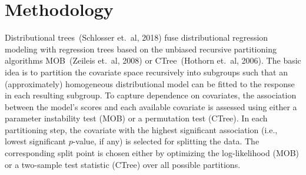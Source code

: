 \documentclass[twoside]{report}
\begin{document}



\section{Methodology}

Distributional trees~(Schlosser et.~al, 2018) fuse distributional regression modeling with
regression trees based on the unbiased recursive partitioning algorithms MOB~(Zeileis et.~al, 2008)
or CTree~(Hothorn et.~al, 2006). The basic idea is to partition the covariate space recursively into 
subgroups such that an (approximately) homogeneous distributional model can be fitted to the response 
in each resulting subgroup.
To capture dependence on covariates, the association between the model's scores and each available
covariate is assessed using either a parameter instability test (MOB) or a permutation test (CTree).
In each partitioning step, the covariate with the highest significant association (i.e., lowest
significant $p$-value, if any) is selected for splitting the data. The corresponding split point
is chosen either by optimizing the log-likelihood (MOB) or a two-sample test statistic (CTree)
over all possible partitions.
\end{document}

